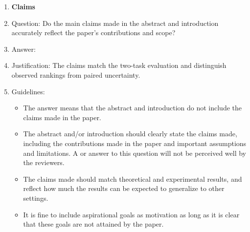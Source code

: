 \documentclass{article}
\begin{document}
\begin{enumerate}

\item {\bf Claims}
    \item[] Question: Do the main claims made in the abstract and introduction accurately reflect the paper's contributions and scope?
    \item[] Answer: \answerYes{}
    \item[] Justification: The claims match the two-task evaluation and distinguish observed rankings from paired uncertainty.
    \item[] Guidelines:
    \begin{itemize}
        \item The answer \answerNA{} means that the abstract and introduction do not include the claims made in the paper.
        \item The abstract and/or introduction should clearly state the claims made, including the contributions made in the paper and important assumptions and limitations. A \answerNo{} or \answerNA{} answer to this question will not be perceived well by the reviewers. 
        \item The claims made should match theoretical and experimental results, and reflect how much the results can be expected to generalize to other settings. 
        \item It is fine to include aspirational goals as motivation as long as it is clear that these goals are not attained by the paper. 
    \end{itemize}


\end{enumerate}
\end{document}
